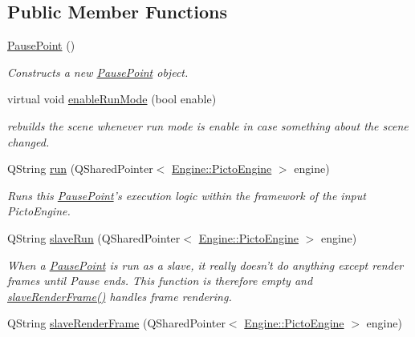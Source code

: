 \subsection*{Public Member Functions}
\begin{DoxyCompactItemize}
\item 
\hyperlink{class_picto_1_1_pause_point_a852cec194f31a9d2bbba3de7cb9e2625}{Pause\-Point} ()
\begin{DoxyCompactList}\small\item\em Constructs a new \hyperlink{class_picto_1_1_pause_point}{Pause\-Point} object. \end{DoxyCompactList}\item 
\hypertarget{class_picto_1_1_pause_point_a98a4284c765565291b94931f68cfb8f5}{virtual void \hyperlink{class_picto_1_1_pause_point_a98a4284c765565291b94931f68cfb8f5}{enable\-Run\-Mode} (bool enable)}\label{class_picto_1_1_pause_point_a98a4284c765565291b94931f68cfb8f5}

\begin{DoxyCompactList}\small\item\em rebuilds the scene whenever run mode is enable in case something about the scene changed. \end{DoxyCompactList}\item 
Q\-String \hyperlink{class_picto_1_1_pause_point_a49239efcd1862ce035d4ff2f0ea02be1}{run} (Q\-Shared\-Pointer$<$ \hyperlink{class_picto_1_1_engine_1_1_picto_engine}{Engine\-::\-Picto\-Engine} $>$ engine)
\begin{DoxyCompactList}\small\item\em Runs this \hyperlink{class_picto_1_1_pause_point}{Pause\-Point}'s execution logic within the framework of the input Picto\-Engine. \end{DoxyCompactList}\item 
\hypertarget{class_picto_1_1_pause_point_ac062ab9f8b338924ee0312793ed5fc4f}{Q\-String \hyperlink{class_picto_1_1_pause_point_ac062ab9f8b338924ee0312793ed5fc4f}{slave\-Run} (Q\-Shared\-Pointer$<$ \hyperlink{class_picto_1_1_engine_1_1_picto_engine}{Engine\-::\-Picto\-Engine} $>$ engine)}\label{class_picto_1_1_pause_point_ac062ab9f8b338924ee0312793ed5fc4f}

\begin{DoxyCompactList}\small\item\em When a \hyperlink{class_picto_1_1_pause_point}{Pause\-Point} is run as a slave, it really doesn't do anything except render frames until Pause ends. This function is therefore empty and \hyperlink{class_picto_1_1_pause_point_a3b9b0fa544881a6c8ecfaad5424248f7}{slave\-Render\-Frame()} handles frame rendering. \end{DoxyCompactList}\item 
\hypertarget{class_picto_1_1_pause_point_a3b9b0fa544881a6c8ecfaad5424248f7}{Q\-String \hyperlink{class_picto_1_1_pause_point_a3b9b0fa544881a6c8ecfaad5424248f7}{slave\-Render\-Frame} (Q\-Shared\-Pointer$<$ \hyperlink{class_picto_1_1_engine_1_1_picto_engine}{Engine\-::\-Picto\-Engine} $>$ engine)}\label{class_picto_1_1_pause_point_a3b9b0fa544881a6c8ecfaad5424248f7}


\end{DoxyCompactItemize}
